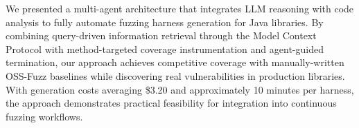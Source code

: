 \documentclass[sigconf,review,anonymous]{acmart}
\begin{document}
We presented a multi-agent architecture that integrates LLM reasoning with code analysis to fully automate fuzzing harness generation for Java libraries. By combining query-driven information retrieval through the Model Context Protocol with method-targeted coverage instrumentation and agent-guided termination, our approach achieves competitive coverage with manually-written OSS-Fuzz baselines while discovering real vulnerabilities in production libraries. With generation costs averaging \$3.20 and approximately 10 minutes per harness, the approach demonstrates practical feasibility for integration into continuous fuzzing workflows.

%



\end{document}
